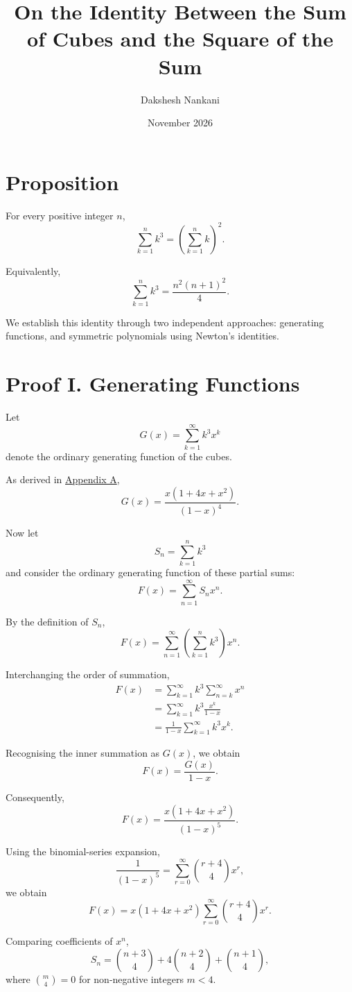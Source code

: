\documentclass[11pt,a4paper]{article}
\title{On the Identity Between the Sum of Cubes and the Square of the Sum}
\author{Dakshesh Nankani}
\date{November 2026}
\begin{document}
\maketitle

\section*{Proposition}

For every positive integer $n$,
\[
\sum_{k=1}^{n} k^3
=
\left(\sum_{k=1}^{n} k\right)^2.
\]

Equivalently,
\[
\sum_{k=1}^{n} k^3
=
\frac{n^2(n+1)^2}{4}.
\]

We establish this identity through two independent approaches:
generating functions, and symmetric polynomials using Newton's
identities.

\section*{Proof I. Generating Functions}

Let
\[
G(x)=\sum_{k=1}^{\infty}k^3x^k
\]
denote the ordinary generating function of the cubes.

As derived in \hyperref[appendix:generating-functions]{Appendix A},
\[
G(x)=\frac{x(1+4x+x^2)}{(1-x)^4}.
\]

Now let
\[
S_n=\sum_{k=1}^{n}k^3
\]
and consider the ordinary generating function of these partial sums:
\[
F(x)=\sum_{n=1}^{\infty}S_nx^n.
\]

By the definition of $S_n$,
\[
F(x)=
\sum_{n=1}^{\infty}
\left(\sum_{k=1}^{n}k^3\right)x^n.
\]

Interchanging the order of summation,
\[
\begin{aligned}
F(x)
&=\sum_{k=1}^{\infty}k^3
\sum_{n=k}^{\infty}x^n\\
&=\sum_{k=1}^{\infty}k^3
\frac{x^k}{1-x}\\
&=\frac{1}{1-x}
\sum_{k=1}^{\infty}k^3x^k.
\end{aligned}
\]

Recognising the inner summation as $G(x)$, we obtain
\[
F(x)=\frac{G(x)}{1-x}.
\]

Consequently,
\[
F(x)=\frac{x(1+4x+x^2)}{(1-x)^5}.
\]

Using the binomial-series expansion,
\[
\frac{1}{(1-x)^5}
=
\sum_{r=0}^{\infty}\binom{r+4}{4}x^r,
\]
we obtain
\[
F(x)=
x(1+4x+x^2)
\sum_{r=0}^{\infty}\binom{r+4}{4}x^r.
\]

Comparing coefficients of $x^n$,
\[
S_n=
\binom{n+3}{4}
+4\binom{n+2}{4}
+\binom{n+1}{4},
\]
where $\binom{m}{4}=0$ for non-negative integers $m<4$.
\end{document}
